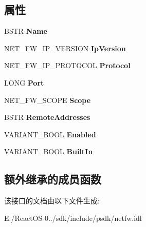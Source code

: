 \subsection*{属性}
\begin{DoxyCompactItemize}
\item 
\mbox{\label{interface_i_net_fw_open_port_af716bbbd641c109960aa388b383310f3}} 
B\+S\+TR {\bfseries Name}
\item 
\mbox{\label{interface_i_net_fw_open_port_ac031d42174b7009e1156d664c5071254}} 
N\+E\+T\+\_\+\+F\+W\+\_\+\+I\+P\+\_\+\+V\+E\+R\+S\+I\+ON {\bfseries Ip\+Version}
\item 
\mbox{\label{interface_i_net_fw_open_port_a1061393b3c0b9ba523d99bff9d2564a0}} 
N\+E\+T\+\_\+\+F\+W\+\_\+\+I\+P\+\_\+\+P\+R\+O\+T\+O\+C\+OL {\bfseries Protocol}
\item 
\mbox{\label{interface_i_net_fw_open_port_a156725b12c3b4f9b21c1e57dc7643c54}} 
L\+O\+NG {\bfseries Port}
\item 
\mbox{\label{interface_i_net_fw_open_port_a116bea2060cc3980809b2b4aef865b7d}} 
N\+E\+T\+\_\+\+F\+W\+\_\+\+S\+C\+O\+PE {\bfseries Scope}
\item 
\mbox{\label{interface_i_net_fw_open_port_a9311185eb10e11eef338f15d90797456}} 
B\+S\+TR {\bfseries Remote\+Addresses}
\item 
\mbox{\label{interface_i_net_fw_open_port_a670ce78090b87c3bb56a791cb05765fd}} 
V\+A\+R\+I\+A\+N\+T\+\_\+\+B\+O\+OL {\bfseries Enabled}
\item 
\mbox{\label{interface_i_net_fw_open_port_aba1da63a5797d4850ee274202da32196}} 
V\+A\+R\+I\+A\+N\+T\+\_\+\+B\+O\+OL {\bfseries Built\+In}
\end{DoxyCompactItemize}
\subsection*{额外继承的成员函数}


该接口的文档由以下文件生成\+:\begin{DoxyCompactItemize}
\item 
E\+:/\+React\+O\+S-\/0../sdk/include/psdk/netfw.\+idl\end{DoxyCompactItemize}
